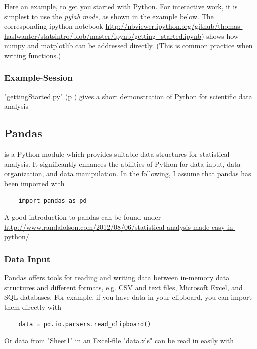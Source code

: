 Here an example, to get you started with Python. For interactive work, it is
simplest to use the \emph{pylab mode}, as shown in the example below. The corresponding ipython
notebook
 \url{http://nbviewer.ipython.org/github/thomas-haslwanter/statsintro/blob/master/ipynb/getting\_started.ipynb})
shows how numpy and matplotlib can be addressed directly. (This is common
practice when writing functions.)

\subsubsection{Example-Session}

\PyImg "gettingStarted.py" (p \pageref{py:gettingStarted_ipy}) gives a short demonstration of Python for scientific data analysis


\subsection{Pandas}


\cite{pandas} is a Python module which provides suitable data structures for
statistical analysis. It significantly enhances the abilities of Python for
data input, data organization, and data manipulation. In the following, I assume
that pandas has been imported with

\begin{lstlisting}
    import pandas as pd
\end{lstlisting}

A good introduction to pandas can be found under
\url{http://www.randalolson.com/2012/08/06/statistical-analysis-made-easy-in-python/}

\subsubsection{Data Input}

Pandas offers tools for reading and writing data between in-memory data structures and different
formats, e.g. CSV and text files, Microsoft Excel, and SQL databases. For example, if you have data
in your clipboard, you can import them directly with

\begin{lstlisting}
    data = pd.io.parsers.read_clipboard()
\end{lstlisting}

Or data from "Sheet1" in an Excel-file "data.xls" can be read in easily with

